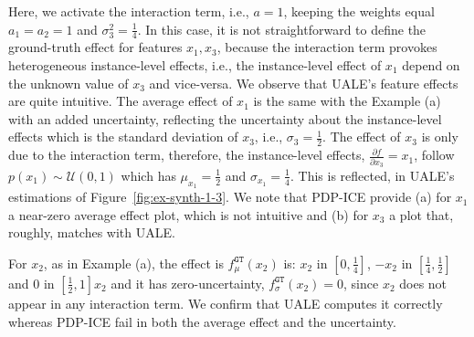 \documentclass[twoside]{article}
\begin{document}
Here, we activate the interaction term, i.e., \(a=1\), keeping the weights equal \(a_1=a_2=1\) and \(\sigma_3^2=\frac{1}{4}\). In this case, it is not straightforward to define the ground-truth effect for features \(x_1, x_3\), because the interaction term provokes heterogeneous instance-level effects, i.e., the instance-level effect of \(x_1\) depend on the unknown value of \(x_3\) and vice-versa. We observe that UALE's feature effects are quite intuitive. The average effect of \(x_1\) is the same with the Example (a) with an added uncertainty, reflecting the uncertainty about the instance-level effects which is the standard deviation of \(x_3\), i.e., \(\sigma_3 = \frac{1}{2}\). The effect of \(x_3\) is only due to the interaction term, therefore, the instance-level effects, \(\frac{\partial f}{\partial x_3} = x_1 \), follow \(p(x_1) \sim \mathcal{U}(0,1)\) which has \(\mu_{x_1}=\frac{1}{2}\) and \(\sigma_{x_1}=\frac{1}{4}\). This is reflected, in UALE's estimations of Figure~\ref{fig:ex-synth-1-3}. We note that PDP-ICE provide (a) for \(x_1\) a near-zero average effect plot, which is not intuitive and (b) for \(x_3\) a plot that, roughly, matches with UALE.

For \(x_2\), as in Example (a), the effect is \(f_\mu^{\mathtt{GT}}(x_2)\) is: \(x_2\) in \([0, \frac{1}{4}]\), \(-x_2\) in \([\frac{1}{4}, \frac{1}{2}]\) and \(0\) in \([\frac{1}{2}, 1]\)\(x_2\) and it has zero-uncertainty, \(f_\sigma^{\mathtt{GT}}(x_2) = 0\), since \(x_2\) does not appear in any interaction term. We confirm that UALE computes it correctly whereas PDP-ICE fail in both the average effect and the uncertainty.
\end{document}
